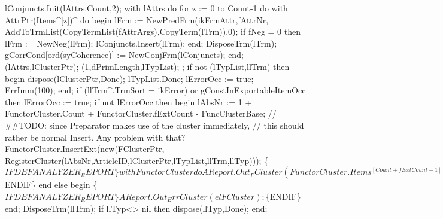       lConjuncts.Init(lAttrs.Count,2);
      with lAttrs do
         for z := 0 to Count-1 do
            with AttrPtr(Items^[z])^ do
         begin
            lFrm := NewPredFrm(ikFrmAttr,fAttrNr,
                               AddToTrmList(CopyTermList(fAttrArgs),CopyTerm(lTrm)),0);
            if fNeg = 0 then
               lFrm := NewNeg(lFrm);
            lConjuncts.Insert(lFrm);
         end;
      DisposeTrm(lTrm);
      gCorrCond[ord(syCoherence)] := NewConjFrm(lConjuncts);
   end;
   (lAttrs,lClusterPtr);
   (1,dPrimLength,lTypList);
   ;
   if not (lTypList,llTrm) then
   begin
      dispose(lClusterPtr,Done);
      lTypList.Done;
      lErrorOcc := true;
      ErrImm(100);
   end;
   if (llTrm^.TrmSort = ikError) or gConstInExportableItemOcc then lErrorOcc := true;
   if not lErrorOcc then
   begin
      lAbsNr :=  1 + FunctorCluster.Count +  FunctorCluster.fExtCount - FuncClusterBase;
      // ##TODO: since Preparator makes use of the cluster immediately,
      //         this should rather be normal Insert. Any problem with that?
      FunctorCluster.InsertExt(new(FClusterPtr,
                                   RegisterCluster(lAbsNr,ArticleID,lClusterPtr,lTypList,llTrm,llTyp)));
      \{$IFDEF ANALYZER_REPORT\}
      with FunctorCluster do
         AReport.Out_FCluster(FunctorCluster.Items^[Count+fExtCount-1]);
      \{$ENDIF\}
   end
   else
   begin
      \{$IFDEF ANALYZER_REPORT\}
      AReport.Out_ErrCluster(elFCluster);
      \{$ENDIF\}
   end;
   DisposeTrm(llTrm);
   if llTyp<> nil
   then dispose(llTyp,Done);
end;
\eatline
{}\nwendcode{}\nwdocspar
